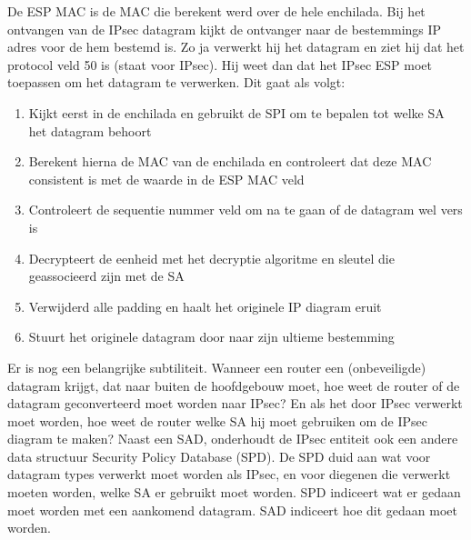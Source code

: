 De ESP MAC is de MAC die berekent werd over de hele enchilada.
Bij het ontvangen van de IPsec datagram kijkt de ontvanger naar de bestemmings IP adres voor de hem bestemd is. Zo ja verwerkt hij het datagram en ziet hij dat het protocol veld 50 is (staat voor IPsec). Hij weet dan dat het IPsec ESP moet toepassen om het datagram te verwerken. Dit gaat als volgt:
\begin{enumerate}
    


\item Kijkt eerst in de enchilada en gebruikt de SPI om te bepalen tot welke SA het datagram behoort
\item Berekent hierna de MAC van de enchilada en controleert dat deze MAC consistent is met de waarde in de ESP MAC veld
\item Controleert de sequentie nummer veld om na te gaan of de datagram wel vers is
\item Decrypteert de eenheid met het decryptie algoritme en sleutel die geassocieerd zijn met de SA
\item Verwijderd alle padding en haalt het originele IP diagram eruit
\item Stuurt het originele datagram door naar zijn ultieme bestemming
\end{enumerate}
Er is nog een belangrijke subtiliteit. Wanneer een router een (onbeveiligde) datagram krijgt, dat naar buiten de hoofdgebouw moet, hoe weet de router of de datagram geconverteerd moet worden naar IPsec? En als het door IPsec verwerkt moet worden, hoe weet de router welke SA hij moet gebruiken om de IPsec diagram te maken?
Naast een SAD, onderhoudt de IPsec entiteit ook een andere data structuur Security Policy Database (SPD). De SPD duid aan wat voor datagram types verwerkt moet worden als IPsec, en voor diegenen die verwerkt moeten worden, welke SA er gebruikt moet worden.
SPD indiceert wat er gedaan moet worden met een aankomend datagram.
SAD indiceert hoe dit gedaan moet worden.

\clearpage


